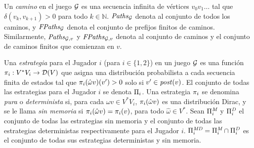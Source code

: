%
%
Un \emph{camino} en el juego $\mathcal{G}$ es una secuencia infinita de vértices $v_0 v_1 \dots$ tal que $\delta(v_k, v_{k+1})>0$ para todo $k \in \mathbb{N}$.
$\mathit{Paths}_{\mathcal{G}}$ denota al conjunto de todos los caminos, y $\mathit{FPaths}_{\mathcal{G}}$ denota el conjunto de prefijos finitos de caminos. 
Similarmente, $\mathit{Paths}_{\mathcal{G},v}$  y  $\mathit{FPaths}_{\mathcal{G},v}$ denota al conjunto de caminos y el conjunto de caminos finitos que comienzan en $v$.
	 

Una \emph{estrategia} para el Jugador $i$ (para $i\in\{1,2\}$) en un juego $\mathcal{G}$ es una función $\pi_{i}: V^*  V_i \rightarrow \mathcal{D}(V)$ que asigna una distribución probabilista a cada secuencia finita de estados tal que $\pi_{i}(\hat{\omega}v)(v') > 0$ solo si $v' \in \mathit{post}(v)$. El conjunto de todas las estrategias para el Jugador $i$ se denota $\Pi_{i}$. Una estrategia $\pi_{i}$ se denomina \emph{pura} o \emph{determinista} si, para cada $\hat{\omega} v \in V^*V_i$, $\pi_{i}(\hat{\omega} v)$  es una distribución Dirac, y se le llama \emph{sin memoria} si $\pi_{i}(\hat{\omega} v) = \pi_{i}(v)$, para todo $\hat{\omega} \in V^*$.
%
%
Sean $\Pi^{\textit{M}}_{i}$ y $\Pi^{\textit{D}}_{i}$ el conjunto de todas las estrategias sin memoria y el conjunto de todas las estrategias deterministas respectivamente para el Jugador $i$.  $\Pi^{\textit{MD}}_{i} = \Pi^{\textit{M}}_{i} \cap \Pi^{\textit{D}}_{i}$ es el conjunto de todas sus estrategias deterministas y sin memoria.

